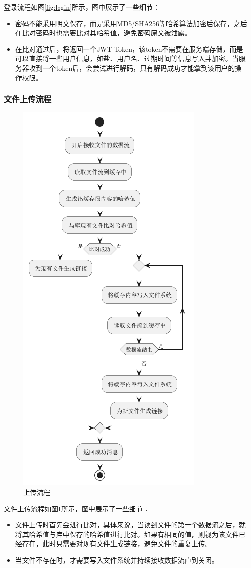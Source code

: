 登录流程如图\ref{fig:login}所示，图中展示了一些细节：
\begin{itemize}
    \item 密码不能采用明文保存，而是采用MD5/SHA256等哈希算法加密后保存，之后在比对密码时也需要比对其哈希值，避免密码原文被泄露。
    \item 在比对通过后，将返回一个JWT Token，该token不需要在服务端存储，而是可以直接将一些用户信息，如盐、用户名、过期时间等信息写入并加密。当服务器收到一个token后，会尝试进行解码，只有解码成功才能拿到该用户的操作权限。
\end{itemize}

\subsubsection{文件上传流程}

\begin{figure}[H]
    \centering
    \includegraphics[scale=0.65]{examples/上传流程.png}
    \caption{上传流程}
    \label{fig:upload}
\end{figure}

文件上传流程如图\ref{fig:upload}所示，图中展示了一些细节：
\begin{itemize}
    \item 文件上传时首先会进行比对，具体来说，当读到文件的第一个数据流之后，就将其哈希值与库中保存的哈希值进行比对。如果有相同的值，则视为该文件已经存在，此时只需要对现有文件生成链接，避免文件的重复上传。
    \item 当文件不存在时，才需要写入文件系统并持续接收数据流直到关闭。
\end{itemize}
